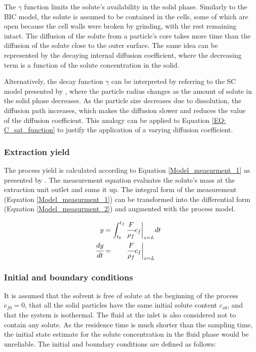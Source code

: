 \documentclass[a4paper,fleqn]{cas-dc}
\begin{document}
			The $\gamma$ function limits the solute's availability in the solid phase. Similarly to the BIC model, the solute is assumed to be contained in the cells, some of which are open because the cell walls were broken by grinding, with the rest remaining intact. The diffusion of the solute from a particle's core takes more time than the diffusion of the solute close to the outer surface. The same idea can be represented by the decaying internal diffusion coefficient, where the decreasing term is a function of the solute concentration in the solid. 
			
			Alternatively, the decay function $\gamma$ can be interpreted by referring to the SC model presented by \citet{Goto1996}, where the particle radius changes as the amount of solute in the solid phase decreases. As the particle size decreases due to dissolution, the diffusion path increases, which makes the diffusion slower and reduces the value of the diffusion coefficient. This analogy can be applied to Equation \ref{EQ: C_sat_function} to justify the application of a varying diffusion coefficient.
			
			\subsubsection{Extraction yield} \label{CH: Yield}
			
			The process yield is calculated according to Equation \ref{Model_measurment_1} as presented by \citet{Sovova1994a}. The measurement equation evaluates the solute's mass at the extraction unit outlet and sums it up. The integral form of the measurement (Equation \ref{Model_measurment_1}) can be transformed into the differential form (Equation \ref{Model_measurment_2}) and augmented with the process model.
			
			{\footnotesize
				\begin{align} 
					\label{Model_measurment_1}
					y &= \int_{t_0}^{t_f} \cfrac{F}{\rho_f} c_f \biggr\rvert_{z=L} dt \\
					\cfrac{dy}{dt} &= \qquad \cfrac{F}{\rho_f} c_f \biggr\rvert_{z=L} 
					\label{Model_measurment_2}
			\end{align}	}
			
			\subsubsection{Initial and boundary conditions} 
			It is assumed that the solvent is free of solute at the beginning of the process $c_{f0}=0$, that all the solid particles have the same initial solute content $c_{s0}$, and that the system is isothermal. The fluid at the inlet is also considered not to contain any solute. As the residence time is much shorter than the sampling time, the initial state estimate for the solute concentration in the fluid phase would be unreliable. The initial and boundary conditions are defined as follows:
			
\end{document}
